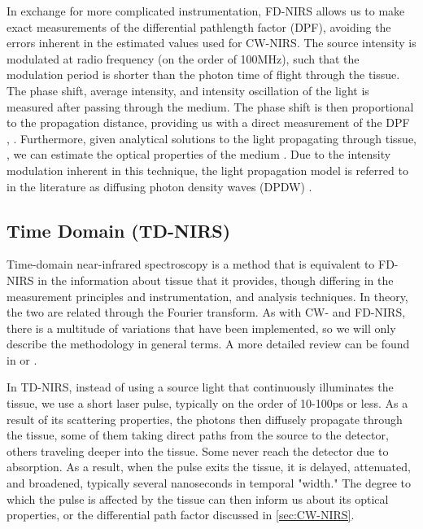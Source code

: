 In exchange for more complicated instrumentation, FD-NIRS allows us to make exact measurements of the differential pathlength factor (DPF), avoiding the errors inherent in the estimated values used for CW-NIRS. The source intensity is modulated at radio frequency (on the order of 100MHz), such that the modulation period is shorter than the photon time of flight through the tissue. The phase shift, average intensity, and intensity oscillation of the light is measured after passing through the medium. The phase shift is then proportional to the propagation distance, providing us with a direct measurement of the DPF \cite[ch. 2]{Madsen2013}, \cite[ch. 19]{Handbook} \cite{Delpy1997}. Furthermore, given analytical solutions to the light propagating through tissue, \cite{Fantini1994, Fishkin1993}, we can estimate the optical properties of the medium \cite{Franceschini1999}. Due to the intensity modulation inherent in this technique, the light propagation model is referred to in the literature as diffusing photon density waves (DPDW) \cite{Boas1996thesis, Oleary1996thesis, Fishkin1993}.


\subsection{Time Domain (TD-NIRS)} \label{sec:TD-NIRS}
Time-domain near-infrared spectroscopy is a method that is equivalent to FD-NIRS in the information about tissue that it provides, though differing in the measurement principles and instrumentation, and analysis techniques. In theory, the two are related through the Fourier transform. As with CW- and FD-NIRS, there is a multitude of variations that have been implemented, so we will only describe the methodology in general terms. A more detailed review can be found in \cite{Torricelli2014} or \cite[ch. 20]{Handbook}.

In TD-NIRS, instead of using a source light that continuously illuminates the tissue, we use a short laser pulse, typically on the order of 10-100ps or less. As a result of its scattering properties, the photons then diffusely propagate through the tissue, some of them taking direct paths from the source to the detector, others traveling deeper into the tissue. Some never reach the detector due to absorption. As a result, when the pulse exits the tissue, it is delayed, attenuated, and broadened, typically several nanoseconds in temporal "width." The degree to which the pulse is affected by the tissue can then inform us about its optical properties, or the differential path factor discussed in \autoref{sec:CW-NIRS}. 


